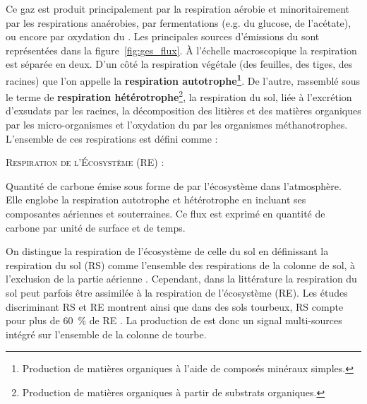 Ce gaz est produit principalement par la respiration aérobie et minoritairement par les respirations anaérobies, par fermentations (e.g. du glucose, de l'acétate), ou encore par oxydation du \chh \citep{lai2009}.
Les principales sources d'émissions du \coo sont représentées dans la figure~\ref{fig:ges_flux}.
À l'échelle macroscopique la respiration est séparée en deux.
D'un côté la respiration végétale (des feuilles, des tiges, des racines) que l'on appelle la \textbf{respiration autotrophe\footnote{Production de matières organiques à l'aide de composés minéraux simples.}}.
De l'autre, rassemblé sous le terme de \textbf{respiration hétérotrophe}\footnote{Production de matières organiques à partir de substrats organiques.}, la respiration du sol, liée à l'excrétion d'exsudats par les racines, la décomposition des litières et des matières organiques par les micro-organismes et l'oxydation du \chh par les organismes méthanotrophes.
L'ensemble de ces respirations est défini comme : 
\begin{pdef}
\textsc{Respiration de l'Écosystème (RE)} :

Quantité de carbone émise sous forme de \coo par l'écosystème dans l'atmosphère. 
Elle englobe la respiration autotrophe et hétérotrophe en incluant ses composantes aériennes et souterraines.
Ce flux est exprimé en quantité de carbone par unité de surface et de temps.
\end{pdef}
On distingue la respiration de l'écosystème de celle du sol en définissant la respiration du sol (RS) comme l'ensemble des respirations de la colonne de sol, à l'exclusion de la partie aérienne \citep{luo20063}.
Cependant, dans la littérature la respiration du sol peut parfois être assimilée à la respiration de l'écosystème (RE)\citep{raich1992}.
Les études discriminant RS et RE montrent ainsi que dans des sols tourbeux, RS compte pour plus de \SI{60}{\percent} de RE \cite{lohila2003}.
%
La production de \coo est donc un signal multi-sources intégré sur l'ensemble de la colonne de tourbe.
